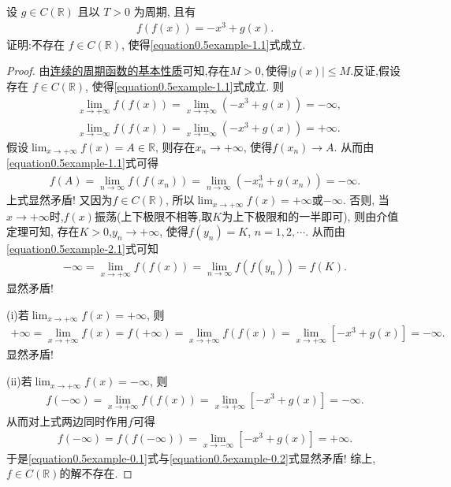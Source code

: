 \documentclass[../../main.tex]{subfiles}%
\begin{document}
\begin{example}
设 \(g\in C(\mathbb{R})\) 且以 \(T > 0\) 为周期, 且有
\begin{align}
f(f(x))=-x^3 + g(x).\label{equation0.5example-1.1}
\end{align}
证明:不存在 \(f\in C(\mathbb{R})\), 使得\eqref{equation0.5example-1.1}式成立. 
\end{example}
\begin{proof}
由\hyperref[proposition:连续的周期函数的基本性质]{连续的周期函数的基本性质}可知,存在$M>0,$使得$|g(x)|\leqslant M.$反证,假设存在 \(f\in C(\mathbb{R})\), 使得\eqref{equation0.5example-1.1}式成立. 则
\begin{align}
&\underset{x\rightarrow +\infty}{\lim}f\left( f\left( x \right) \right) =\underset{x\rightarrow +\infty}{\lim}\left( -x^3+g\left( x \right) \right) =-\infty ,\label{equation0.5example-2.1}
\\
&\underset{x\rightarrow -\infty}{\lim}f\left( f\left( x \right) \right) =\underset{x\rightarrow -\infty}{\lim}\left( -x^3+g\left( x \right) \right) =+\infty .\label{equation0.5example-2.2}
\end{align}
假设\(\lim_{x\rightarrow +\infty}f(x) = A\in \mathbb{R}\), 则存在\(x_n\rightarrow +\infty\), 使得\(f(x_n)\rightarrow A\). 从而由\eqref{equation0.5example-1.1}式可得
\begin{align*}
f(A) = \lim_{n\rightarrow \infty}f(f(x_n)) = \lim_{n\rightarrow \infty}(-x_{n}^{3}+g(x_n)) = -\infty.
\end{align*}
上式显然矛盾! 又因为\(f\in C(\mathbb{R})\), 所以\(\lim_{x\rightarrow +\infty}f(x) = +\infty\)或\(-\infty\).
否则, 当\(x\rightarrow +\infty\)时,\(f(x)\)振荡(上下极限不相等,取$K$为上下极限和的一半即可), 则由介值定理可知, 存在$K>0$,\(y_n\rightarrow +\infty\), 使得\(f(y_n) = K\), \(n = 1,2,\cdots\).
从而由\eqref{equation0.5example-2.1}式可知
\begin{align*}
-\infty = \lim_{x\rightarrow +\infty}f(f(x)) = \lim_{n\rightarrow \infty}f(f(y_n)) = f(K).
\end{align*}
显然矛盾!

(i)若\(\lim_{x\rightarrow +\infty}f(x) = +\infty\), 则
\begin{align*}
+\infty = \lim_{x\rightarrow +\infty}f(x) = f(+\infty) = \lim_{x\rightarrow +\infty}f(f(x)) = \lim_{x\rightarrow +\infty}[-x^3 + g(x)] = -\infty.
\end{align*}
显然矛盾!

(ii)若\(\lim_{x\rightarrow +\infty}f(x) = -\infty\), 则
\begin{align}
f(-\infty) = \lim_{x\rightarrow +\infty}f(f(x)) = \lim_{x\rightarrow +\infty}[-x^3 + g(x)] = -\infty. \label{equation0.5example-0.1}
\end{align}
从而对上式两边同时作用\(f\)可得
\begin{align}
f(-\infty) = f(f(-\infty)) = \lim_{x\rightarrow -\infty}[-x^3 + g(x)] = +\infty. \label{equation0.5example-0.2}
\end{align}
于是\eqref{equation0.5example-0.1}式与\eqref{equation0.5example-0.2}式显然矛盾!
综上,\(f\in C(\mathbb{R})\)的解不存在. 
\end{proof}
\end{document}
